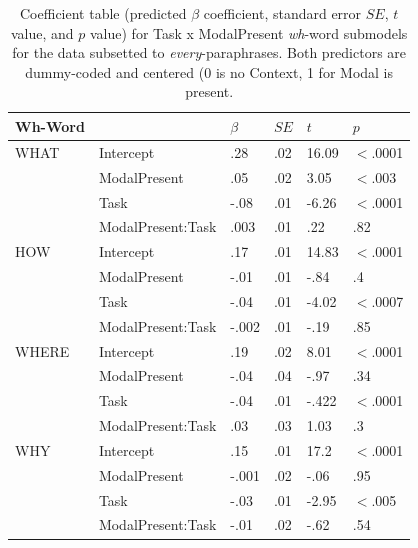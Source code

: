 \documentclass[12pt,letterpaper,table,svgnames,dvipsnames]{article}
\begin{document}
\begin{table}
\begin{center} 
\caption{Coefficient table (predicted $\beta$ coefficient, standard error $SE$, $t$ value, and $p$ value) for Task x ModalPresent \emph{wh}-word submodels for the data subsetted to \emph{every}-paraphrases. Both predictors are dummy-coded and centered (0 is no Context, 1 for Modal is present.} 
\label{sub-models_res_Task-every} 
\begin{tabular}{l|lllll} 
\toprule
Wh-Word & {} & $\beta$ & $SE$ & $t$ & $p$\\
\midrule
WHAT & Intercept & .28 & .02 & 16.09 & $<$.0001\\
{} & ModalPresent & .05 & .02 & 3.05 & $<$.003\\
{} & Task & -.08 & .01 & -6.26 & $<$.0001\\
{} & ModalPresent:Task & .003 & .01 & .22 & .82\\
\bottomrule
\toprule
HOW & Intercept & .17 & .01 & 14.83 & $<$.0001\\
{} & ModalPresent & -.01 & .01 & -.84 & .4\\
{} & Task & -.04 & .01 & -4.02 & $<$.0007\\
{} & ModalPresent:Task & -.002 & .01 & -.19 & .85\\
\toprule
WHERE & Intercept & .19 & .02 & 8.01 & $<$.0001\\
{} & ModalPresent & -.04 & .04 & -.97 & .34\\
{} & Task & -.04 & .01 & -.422 & $<$.0001\\
{} & ModalPresent:Task & .03 & .03 & 1.03 & .3\\
\bottomrule
\toprule
WHY & Intercept & .15 & .01 & 17.2 & $<$.0001\\
{} & ModalPresent & -.001 & .02 & -.06 & .95\\
{} & Task & -.03 & .01 & -2.95 & $<$.005\\
{} & ModalPresent:Task & -.01 & .02 & -.62 & .54\\

\end{tabular}
\end{center}
\end{table}
\end{document}
